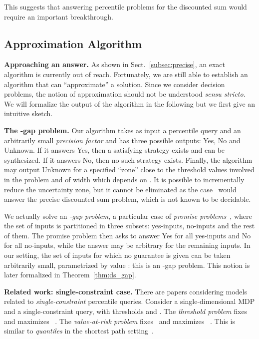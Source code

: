 \documentclass{llncs}
\begin{document}
This suggests that answering percentile problems for the discounted sum would require an important breakthrough.

\subsection{Approximation Algorithm}
\label{subsec:approx}

\smallskip\noindent\textbf{Approaching an answer.} As shown in Sect.~\ref{subsec:precise}, an exact algorithm is currently out of reach. Fortunately, we are still able to establish an algorithm that can ``approximate'' a solution. Since we consider decision problems, the notion of approximation should not be understood \textit{sensu stricto}. We will formalize the output of the algorithm in the following but we first give an intuitive sketch.

\smallskip\noindent\textbf{The -gap problem.} Our algorithm takes as input a percentile query and an arbitrarily small \textit{precision factor}  and has three possible outputs: \textsf{Yes}, \textsf{No} and \textsf{Unknown}. If it answers \textsf{Yes}, then a satisfying strategy exists and can be synthesized. If it answers \textsf{No}, then no such strategy exists. Finally, the algorithm may output \textsf{Unknown} for a specified ``zone'' close to the threshold values involved in the problem and of width which depends on .
It is possible to incrementally reduce the uncertainty zone, but it cannot be eliminated as the case~ would answer the precise discounted sum problem, which is not known to be decidable.

We actually solve an \emph{-gap problem}, a particular case of \emph{promise problems}~\cite{DBLP:conf/birthday/Goldreich06a},
where the set of inputs is partitioned in three subsets: yes-inputs, no-inputs and the rest of them. The promise problem then asks to answer \textsf{Yes} for all yes-inputs and \textsf{No} for all no-inputs, while the answer may be arbitrary for the remaining inputs. 
In our setting, the set of inputs for which no guarantee is given can be taken arbitrarily small, parametrized by value : this is an -gap problem. This notion is later formalized in Theorem~\ref{thm:ds_gap}.

\smallskip\noindent\textbf{Related work: single-constraint case.} There are papers considering models related to \textit{single-constraint} percentile queries. Consider a single-dimensional MDP and a single-constraint query, with thresholds  and . The \textit{threshold problem} fixes  and maximizes ~\cite{White1993634,WL99}. The \textit{value-at-risk problem} fixes~ and maximizes ~\cite{DBLP:conf/fsttcs/BrazdilCFNS13}. This is similar to \textit{quantiles} in the shortest path setting~\cite{DBLP:conf/fossacs/UmmelsB13}.
\end{document}
